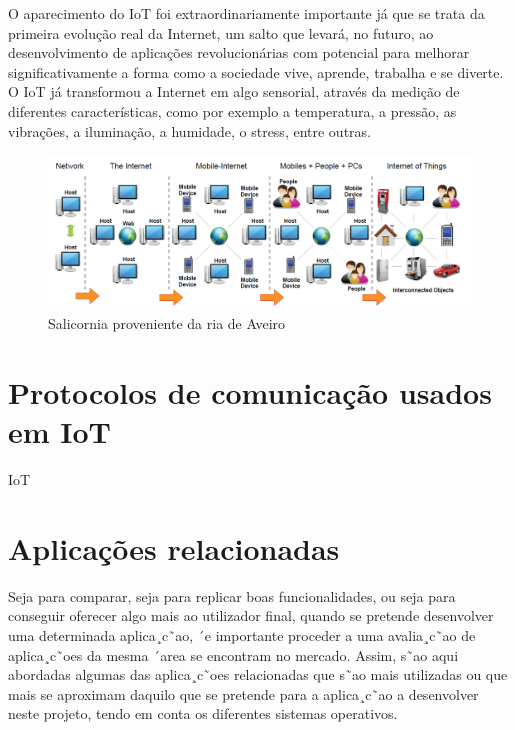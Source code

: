 O aparecimento do IoT foi extraordinariamente importante já que se trata da primeira evolução real da Internet, um salto que levará, no futuro, ao desenvolvimento de aplicações revolucionárias com potencial para melhorar significativamente a forma como a sociedade vive, aprende, trabalha e se diverte. O IoT já transformou a Internet em algo sensorial, através da medição de diferentes características, como por exemplo a temperatura, a pressão, as vibrações, a iluminação, a humidade, o stress, entre outras. 


\begin{figure}[!htb]
	\centering
	\includegraphics[scale=0.5]{img/cap3-iot/diagrama-evolution.png}
	\caption{Salicornia proveniente da ria de Aveiro}
	\label{Rotulo}
\end{figure}




\section{Protocolos de comunicação usados em \ac{IoT}}



\ac{IoT}


\section{Aplicações relacionadas}

Seja para comparar, seja para replicar boas funcionalidades, ou seja para conseguir oferecer
algo mais ao utilizador final, quando se pretende desenvolver uma determinada aplica¸c˜ao, ´e
importante proceder a uma avalia¸c˜ao de aplica¸c˜oes da mesma ´area se encontram no mercado.
Assim, s˜ao aqui abordadas algumas das aplica¸c˜oes relacionadas que s˜ao mais utilizadas ou
que mais se aproximam daquilo que se pretende para a aplica¸c˜ao a desenvolver neste projeto,
tendo em conta os diferentes sistemas operativos.

